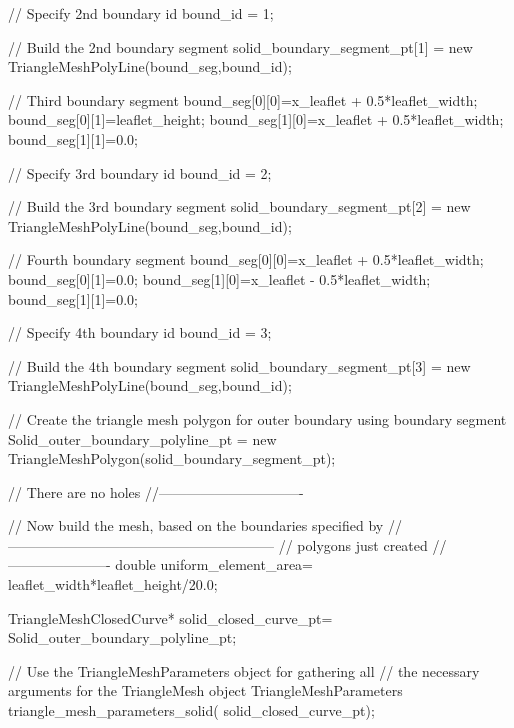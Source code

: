 \begin{DoxyCodeInclude}
 \textcolor{comment}{// Specify 2nd boundary id}
 bound\_id = 1;

 \textcolor{comment}{// Build the 2nd boundary segment}
 solid\_boundary\_segment\_pt[1] = \textcolor{keyword}{new} TriangleMeshPolyLine(bound\_seg,bound\_id);

 \textcolor{comment}{// Third boundary segment}
 bound\_seg[0][0]=x\_leaflet + 0.5*leaflet\_width;
 bound\_seg[0][1]=leaflet\_height;
 bound\_seg[1][0]=x\_leaflet + 0.5*leaflet\_width;
 bound\_seg[1][1]=0.0;

 \textcolor{comment}{// Specify 3rd boundary id}
 bound\_id = 2;

 \textcolor{comment}{// Build the 3rd boundary segment}
 solid\_boundary\_segment\_pt[2] = \textcolor{keyword}{new} TriangleMeshPolyLine(bound\_seg,bound\_id);

 \textcolor{comment}{// Fourth boundary segment}
 bound\_seg[0][0]=x\_leaflet + 0.5*leaflet\_width;
 bound\_seg[0][1]=0.0;
 bound\_seg[1][0]=x\_leaflet - 0.5*leaflet\_width;
 bound\_seg[1][1]=0.0;

 \textcolor{comment}{// Specify 4th boundary id}
 bound\_id = 3;

 \textcolor{comment}{// Build the 4th boundary segment}
 solid\_boundary\_segment\_pt[3] = \textcolor{keyword}{new} TriangleMeshPolyLine(bound\_seg,bound\_id);
  
 \textcolor{comment}{// Create the triangle mesh polygon for outer boundary using boundary segment}
 Solid\_outer\_boundary\_polyline\_pt = 
  \textcolor{keyword}{new} TriangleMeshPolygon(solid\_boundary\_segment\_pt);

 \textcolor{comment}{// There are no holes}
 \textcolor{comment}{//-------------------------------}
 
 \textcolor{comment}{// Now build the mesh, based on the boundaries specified by}
 \textcolor{comment}{//---------------------------------------------------------}
 \textcolor{comment}{// polygons just created}
 \textcolor{comment}{//----------------------}
 \textcolor{keywordtype}{double} uniform\_element\_area= leaflet\_width*leaflet\_height/20.0;

 TriangleMeshClosedCurve* solid\_closed\_curve\_pt=
  Solid\_outer\_boundary\_polyline\_pt;

 \textcolor{comment}{// Use the TriangleMeshParameters object for gathering all}
 \textcolor{comment}{// the necessary arguments for the TriangleMesh object}
 TriangleMeshParameters triangle\_mesh\_parameters\_solid(
   solid\_closed\_curve\_pt);


\end{DoxyCodeInclude}
